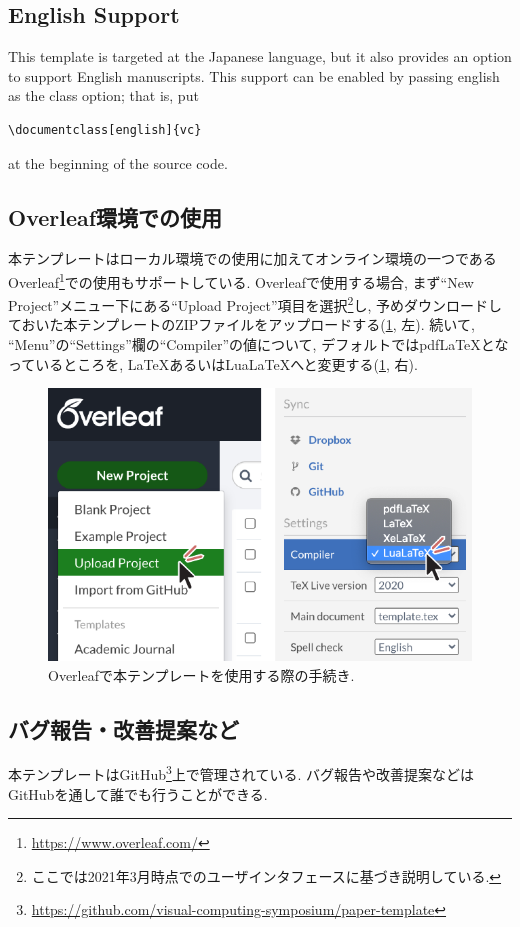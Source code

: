 \documentclass[anonymous]{vc}
\begin{document}
\subsection{English Support}

\noindent
This template is targeted at the Japanese language, but it also provides an option to support English manuscripts.
This support can be enabled by passing \textsf{english} as the class option; that is, put
\begin{verbatim}
\documentclass[english]{vc}
\end{verbatim}
at the beginning of the source code.

\subsection{Overleaf環境での使用}

本テンプレートはローカル環境での使用に加えてオンライン環境の一つであるOverleaf\footnote{\url{https://www.overleaf.com/}}での使用もサポートしている.
Overleafで使用する場合, まず``New Project''メニュー下にある``Upload Project''項目を選択\footnote{ここでは2021年3月時点でのユーザインタフェースに基づき説明している.}し, 予めダウンロードしておいた本テンプレートのZIPファイルをアップロードする(\cref{fig:overleaf}, 左).
続いて, ``Menu''の``Settings''欄の``Compiler''の値について, デフォルトでは{pdfLaTeX}となっているところを, LaTeXあるいはLuaLaTeXへと変更する(\cref{fig:overleaf}, 右).

\begin{figure}
  \centering
  \includegraphics[width=\columnwidth]{./figures/overleaf.pdf}
  \caption{Overleafで本テンプレートを使用する際の手続き.}
  \label{fig:overleaf}
\end{figure}

\subsection{バグ報告・改善提案など}

本テンプレートはGitHub\footnote{\url{https://github.com/visual-computing-symposium/paper-template}}上で管理されている.
バグ報告や改善提案などはGitHubを通して誰でも行うことができる.



\end{document}
